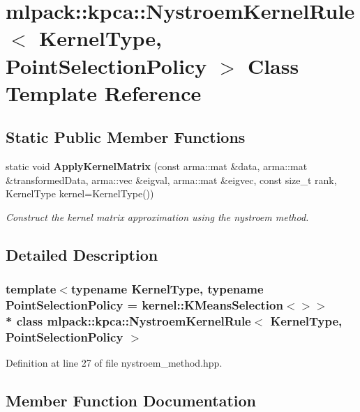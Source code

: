 \section{mlpack\+:\+:kpca\+:\+:Nystroem\+Kernel\+Rule$<$ Kernel\+Type, Point\+Selection\+Policy $>$ Class Template Reference}
\label{classmlpack_1_1kpca_1_1NystroemKernelRule}
\subsection*{Static Public Member Functions}
\begin{DoxyCompactItemize}
\item 
static void {\bf Apply\+Kernel\+Matrix} (const arma\+::mat \&data, arma\+::mat \&transformed\+Data, arma\+::vec \&eigval, arma\+::mat \&eigvec, const size\+\_\+t rank, Kernel\+Type kernel=Kernel\+Type())
\begin{DoxyCompactList}\small\item\em Construct the kernel matrix approximation using the nystroem method. \end{DoxyCompactList}\end{DoxyCompactItemize}


\subsection{Detailed Description}
\subsubsection*{template$<$typename Kernel\+Type, typename Point\+Selection\+Policy = kernel\+::\+K\+Means\+Selection$<$$>$$>$\\*
class mlpack\+::kpca\+::\+Nystroem\+Kernel\+Rule$<$ Kernel\+Type, Point\+Selection\+Policy $>$}



Definition at line 27 of file nystroem\+\_\+method.\+hpp.



\subsection{Member Function Documentation}
